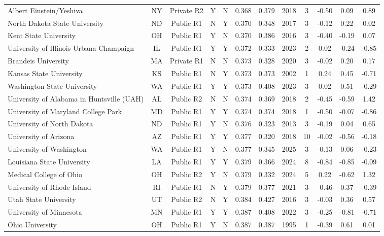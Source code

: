 \begin{longtable}{@{}p{3.55cm}ccccccccccc@{}}
Albert Einstein/Yeshiva & NY & Private R2 & Y & N & 0.368 & 0.379 & 2018 & 3 & -0.50 & 0.09 & 0.89 \\
North Dakota State University & ND & Public R1 & N & Y & 0.370 & 0.348 & 2017 & 3 & -0.12 & 0.22 & 0.02 \\
Kent State University & OH & Public R1 & Y & N & 0.370 & 0.386 & 2016 & 3 & -0.40 & -0.19 & 0.07 \\
University of Illinois Urbana Champaign & IL & Public R1 & Y & Y & 0.372 & 0.333 & 2023 & 2 & 0.02 & -0.24 & -0.85 \\
Brandeis University & MA & Private R1 & N & N & 0.373 & 0.328 & 2020 & 3 & -0.02 & 0.20 & 0.17 \\
Kansas State University & KS & Public R1 & N & Y & 0.373 & 0.373 & 2002 & 1 & 0.24 & 0.45 & -0.71 \\
Washington State University & WA & Public R1 & Y & Y & 0.373 & 0.408 & 2023 & 3 & 0.02 & 0.51 & -0.29 \\
University of Alabama in Huntsville (UAH) & AL & Public R2 & N & N & 0.374 & 0.369 & 2018 & 2 & -0.45 & -0.59 & 1.42 \\
University of Maryland College Park & MD & Public R1 & Y & Y & 0.374 & 0.374 & 2018 & 1 & -0.50 & -0.07 & -0.86 \\
University of North Dakota & ND & Public R1 & Y & N & 0.376 & 0.323 & 2013 & 3 & -0.19 & 0.04 & 0.65 \\
University of Arizona & AZ & Public R1 & Y & Y & 0.377 & 0.320 & 2018 & 10 & -0.02 & -0.56 & -0.18 \\
University of Washington & WA & Public R1 & Y & N & 0.377 & 0.345 & 2025 & 3 & -0.13 & 0.06 & -0.23 \\
Louisiana State University & LA & Public R1 & Y & Y & 0.379 & 0.366 & 2024 & 8 & -0.84 & -0.85 & -0.09 \\
Medical College of Ohio & OH & Public R2 & Y & N & 0.379 & 0.332 & 2024 & 5 & 0.22 & -0.62 & 1.32 \\
University of Rhode Island & RI & Public R1 & N & Y & 0.379 & 0.377 & 2021 & 3 & -0.46 & 0.37 & -0.39 \\
Utah State University & UT & Public R2 & N & Y & 0.384 & 0.427 & 2016 & 3 & -0.03 & 0.36 & 0.57 \\
University of Minnesota & MN & Public R1 & Y & Y & 0.387 & 0.408 & 2022 & 3 & -0.25 & -0.81 & -0.71 \\
Ohio University & OH & Public R1 & Y & N & 0.387 & 0.387 & 1995 & 1 & -0.39 & 0.61 & 0.01 \\

\end{longtable}
